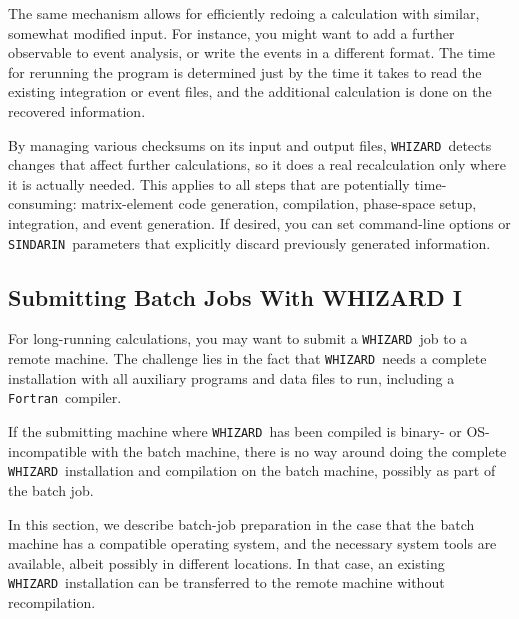\documentclass[12pt]{book}
\newcommand{\whizard}{\texttt{WHIZARD}}
\newcommand{\sindarin}{\texttt{SINDARIN}}
\newcommand{\fortran}{\texttt{Fortran}}
\begin{document}
The same mechanism allows for efficiently redoing a calculation with
similar, somewhat modified input.  For instance, you might want to add
a further observable to event analysis, or write the events in a
different format.  The time for rerunning the program is determined
just by the time it takes to read the existing integration or event
files, and the additional calculation is done on the recovered
information.

By managing various checksums on its input and output files, \whizard\
detects changes that affect further calculations, so it does a
real recalculation only where it is actually needed.  This applies to
all steps that are potentially time-consuming: matrix-element code
generation, compilation, phase-space setup, integration, and event
generation.  If desired, you can set command-line options or
\sindarin\ parameters that explicitly discard previously generated
information.



\subsection{Submitting Batch Jobs With WHIZARD I}
\label{sec:batch}

For long-running calculations, you may want to submit a \whizard\ job
to a remote machine.  The challenge lies in the fact that \whizard\
needs a complete installation with all auxiliary programs and data
files to run, including a \fortran\ compiler.

If the submitting machine where \whizard\ has been compiled is binary-
or OS-incompatible with the batch machine, there is no way around
doing the complete \whizard\ installation and compilation on the batch
machine, possibly as part of the batch job.

In this section, we describe batch-job preparation in the case that
the batch machine has a compatible operating system, and the necessary
system tools are available, albeit possibly in different locations.
In that case, an existing \whizard\ installation can be transferred to
the remote machine without recompilation.
\end{document}

